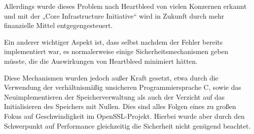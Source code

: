 \documentclass[12pt]{article}
\begin{document}
Allerdings wurde dieses Problem nach Heartbleed von vielen Konzernen erkannt und mit der „Core Infrastructure Initiative“ wird in Zukunft durch mehr finanzielle Mittel entgegengesteuert. 

Ein anderer wichtiger Aspekt ist, dass selbst nachdem der Fehler bereits implementiert war, es normalerweise einige Sicherheitsmechanismen geben müsste, die die Auswirkungen von Heartbleed minimiert hätten. 

Diese Mechanismen wurden jedoch außer Kraft gesetzt, etwa durch die Verwendung der verhältnismäßig unsicheren Programmiersprache C, sowie das Neuimplementieren der Speicherverwaltung als auch der Verzicht auf das Initialisieren des Speichers mit Nullen. Dies sind alles Folgen eines zu großen Fokus auf Geschwindigkeit im OpenSSL-Projekt. Hierbei wurde aber durch den Schwerpunkt auf Performance gleichzeitig die Sicherheit nicht genügend beachtet. 



\end{document}
